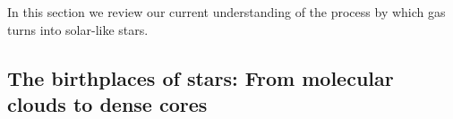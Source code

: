 \documentclass[12pt]{mythesis}
\begin{document}
In this section we review our current understanding of the process by which gas turns into solar-like stars.

\subsection{The birthplaces of stars: From molecular clouds to dense cores}
\end{document}
